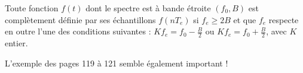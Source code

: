         \begin{theorem}
            Toute fonction $f(t)$ dont le spectre est à bande étroite $(f_0, B)$ est complètement définie par ses échantillons $f(nT_e)$ si $f_e\geq 2B$ et que $f_e$ respecte en outre l'une des conditions suivantes : $Kf_e = f_0 - \frac{B}{2}$ ou $Kf_e = f_0 + \frac{B}{2}$, avec $K$ entier.
        \end{theorem}

        \begin{exemple}
            L'exemple des pages 119 à 121 semble également important !
        \end{exemple}